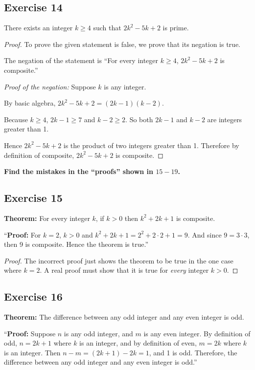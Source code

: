 \documentclass[14pt]{extarticle}
\newcommand{\cy}{\color{cyan}}
\begin{document}
\subsection{Exercise 14}
There exists an integer $k \geq 4$ such that $2k^2 - 5k + 2$ is prime.

\begin{proof}
To prove the given statement is false, we prove that its
negation is true.

The negation of the statement is “For every integer $k \geq 4$, $2k^2 - 5k + 2$ is composite.”

{\it Proof of the negation:} Suppose $k$ is any integer. 

By basic algebra, $2k^2 - 5k + 2 = (2k-1)(k-2)$. 

Because $k \geq 4$, $2k - 1 \geq 7$ and $k - 2 \geq 2$. So both $2k-1$ and $k-2$ are integers greater than 1. 

Hence $2k^2 - 5k + 2$ is the product of two integers greater than 1. Therefore by definition of composite, $2k^2 - 5k + 2$ is composite.
\end{proof}

{\bf \cy Find the mistakes in the “proofs” shown in $15-19$.}

\subsection{Exercise 15}
{\bf Theorem:} For every integer $k$, if $k > 0$ then $k^2 + 2k + 1$ is composite.

“{\bf Proof:} For $k = 2$, $k > 0$ and $k^2 + 2k + 1 = 2^2 + 2\cdot2 + 1 = 9$. And since $9 = 3\cdot3$, then 9 is composite. Hence the theorem is true.”

\begin{proof}
The incorrect proof just shows the theorem to be true in
the one case where $k = 2$. A real proof must show that it
is true for {\it every} integer $k > 0$.
\end{proof}

\subsection{Exercise 16}
{\bf Theorem:} The difference between any odd integer and any even integer is odd.

“{\bf Proof:} Suppose $n$ is any odd integer, and $m$ is any even integer. By definition of odd, $n = 2k + 1$ where $k$ is an integer, and by definition of even, $m = 2k$ where $k$ is an integer. Then $n - m = (2k + 1) - 2k = 1$, and 1 is odd. Therefore, the difference between any odd integer and any even integer is odd.”
\end{document}
